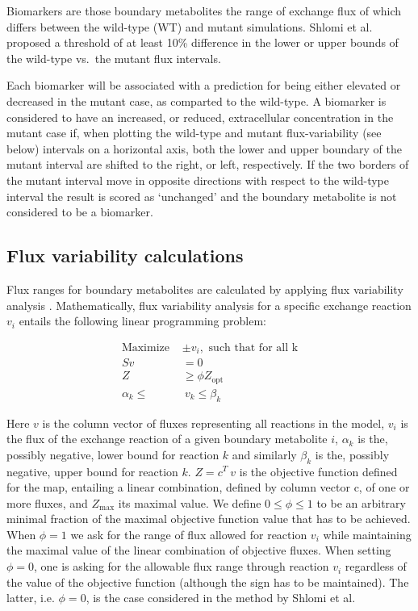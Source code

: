 \documentclass[10pt,a4paper,onecolumn]{article}
\begin{document}
Biomarkers are those boundary metabolites the range of exchange flux of
which differs between the wild-type (WT) and mutant simulations. Shlomi
et al. proposed a threshold of at least 10\% difference in the lower or
upper bounds of the wild-type vs.~the mutant flux intervals.

Each biomarker will be associated with a prediction for being either
elevated or decreased in the mutant case, as comparted to the wild-type.
A biomarker is considered to have an increased, or reduced,
extracellular concentration in the mutant case if, when plotting the
wild-type and mutant flux-variability (see below) intervals on a
horizontal axis, both the lower and upper boundary of the mutant
interval are shifted to the right, or left, respectively. If the two
borders of the mutant interval move in opposite directions with respect
to the wild-type interval the result is scored as `unchanged' and the
boundary metabolite is not considered to be a biomarker.

\subsection{Flux variability
calculations}\label{flux-variability-calculations}

Flux ranges for boundary metabolites are calculated by applying flux
variability analysis \autocite{Mahadevan2003}. Mathematically, flux
variability analysis for a specific exchange reaction \(v_i\) entails
the following linear programming problem:

\begin{align}
\text{Maximize } &\pm v_i, \text{ such that for all k} \nonumber \\
S v &= 0 \nonumber \\
Z  &\geq \phi Z_{\text{opt}} \nonumber \\
\alpha_k \leq & ~ v_k \leq \beta_k 
\end{align}

Here \(v\) is the column vector of fluxes representing all reactions in
the model, \(v_i\) is the flux of the exchange reaction of a given
boundary metabolite \(i\), \(\alpha_k\) is the, possibly negative, lower
bound for reaction \(k\) and similarly \(\beta_k\) is the, possibly
negative, upper bound for reaction \(k\). \(Z = c^T ~ v\) is the
objective function defined for the map, entailing a linear combination,
defined by column vector c, of one or more fluxes, and
\(Z_{\text{max}}\) its maximal value. We define \(0 \leq \phi \leq 1\)
to be an arbitrary minimal fraction of the maximal objective function
value that has to be achieved. When \(\phi=1\) we ask for the range of
flux allowed for reaction \(v_i\) while maintaining the maximal value of
the linear combination of objective fluxes. When setting \(\phi = 0\),
one is asking for the allowable flux range through reaction \(v_i\)
regardless of the value of the objective function (although the sign has
to be maintained). The latter, i.e. \(\phi=0\), is the case considered
in the method by Shlomi et al.
\end{document}
